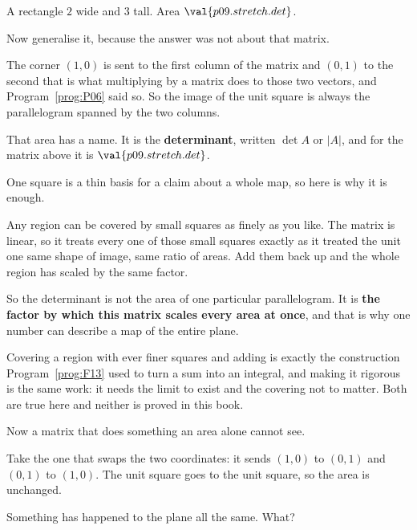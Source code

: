 \begin{fr}
\begin{ansblock}
A rectangle $2$ wide and $3$ tall. Area $\val{p09.stretch.det}$.
\end{ansblock}

Now generalise it, because the answer was not about that matrix.

The corner $(1,0)$ is sent to the first column of the matrix and $(0,1)$ to the
second \dash{} that is what multiplying by a matrix does to those two vectors,
and Program~\ref{prog:P06} said so. So the image of the unit square is always
the parallelogram spanned by the two columns.

That area has a name. It is the \textbf{determinant}, written $\det A$ or
$\lvert A \rvert$, and for the matrix above it is $\val{p09.stretch.det}$.
\end{fr}

\begin{fr}
One square is a thin basis for a claim about a whole map, so here is why it is
enough.

Any region can be covered by small squares as finely as you like. The matrix is
linear, so it treats every one of those small squares exactly as it treated the
unit one \dash{} same shape of image, same ratio of areas. Add them back up and
the whole region has scaled by the same factor.

So the determinant is not the area of one particular parallelogram. It is
\textbf{the factor by which this matrix scales every area at once}, and that is
why one number can describe a map of the entire plane.
\end{fr}

\begin{rigourbox}
Covering a region with ever finer squares and adding is exactly the
construction Program~\ref{prog:F13} used to turn a sum into an integral, and
making it rigorous is the same work: it needs the limit to exist and the
covering not to matter. Both are true here and neither is proved in this book.
\end{rigourbox}


\begin{fr}
Now a matrix that does something an area alone cannot see.

Take the one that swaps the two coordinates: it sends $(1,0)$ to $(0,1)$ and
$(0,1)$ to $(1,0)$. The unit square goes to the unit square, so the area is
unchanged.

Something has happened to the plane all the same. What?
\dotline
\nextframe
\end{fr}

